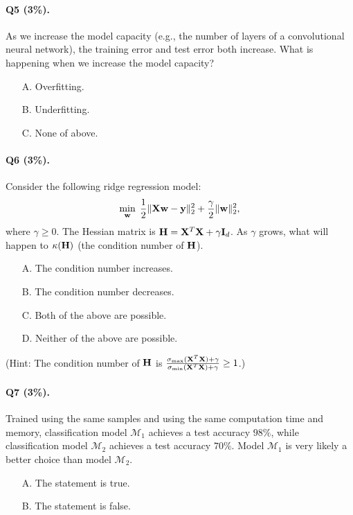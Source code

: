 \documentclass[11pt]{article}
\numberwithin{equation}{section}
\def\H{{\bf H}}
\def\I{{\bf I}}
\def\w{{\bf w}}
\def\X{{\bf X}}
\def\y{{\bf y}}
\begin{document}
\paragraph{Q5 (3\%).} 
As we increase the model capacity (e.g., the number of layers of a convolutional neural network),
the training error and test error both increase.
What is happening when we increase the model capacity?
\begin{itemize}
	\item[A.] Overfitting.
	\item[B.] Underfitting.
	\item[C.] None of above.
\end{itemize}



\paragraph{Q6 (3\%).} 
Consider the following ridge regression model:
\begin{equation*}
\min_{\w} \; \frac{1}{2}\| \X \w - \y \|_2^2  + \frac{\gamma}{2} \| \w \|_2^2 ,
\end{equation*}
where $\gamma \geq 0$.
The Hessian matrix is $\H = \X^T \X + \gamma \I_d$.
As $\gamma$ grows, what will happen to $\kappa (\H)$ (the condition number of $\H$).
\begin{itemize}
	\item[A.]
	The condition number increases.
	\item[B.]
	The condition number decreases.
	\item[C.]
	Both of the above are possible.
	\item[D.]
	Neither of the above are possible.
\end{itemize}
(Hint: The condition number of $\H$ is $\frac{ \sigma_{\max} (\X^T \X) + \gamma }{ \sigma_{\min} (\X^T \X) + \gamma } \geq 1$.)





\paragraph{Q7 (3\%).} 
Trained using the same samples and using the same computation time and memory,
classification model $\mathcal{M}_1$ achieves a test accuracy $98\%$,
while classification model $\mathcal{M}_2$ achieves a test accuracy $70\%$.
Model $\mathcal{M}_1$ is very likely a better choice than model $\mathcal{M}_2$.
\begin{itemize}
	\item[A.]
	The statement is true.
	\item[B.]
	The statement is false.
\end{itemize}
\end{document}
